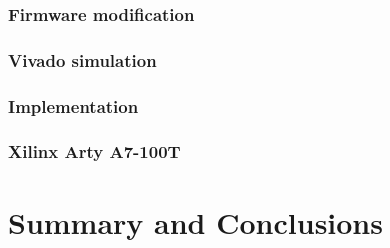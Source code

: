 \documentclass[a4paper,8pt]{report}
\begin{document}
\subsection{Firmware modification}


\subsection{Vivado simulation}                                     

\subsection{Implementation}

\subsection{Xilinx Arty A7-100T}

\chapter{Summary and Conclusions} 




\appendix
\singlespacing

 
%  

\end{document}
